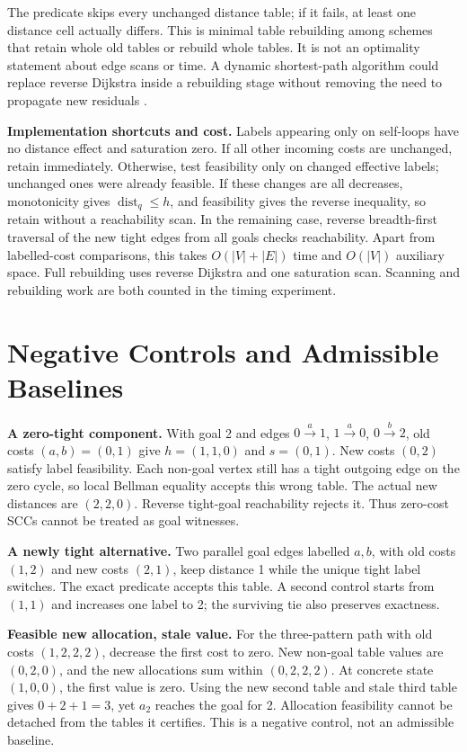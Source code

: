 The predicate skips every unchanged distance table; if it fails, at least one distance cell actually differs. This is minimal table rebuilding among schemes that retain whole old tables or rebuild whole tables. It is not an optimality statement about edge scans or time. A dynamic shortest-path algorithm could replace reverse Dijkstra inside a rebuilding stage without removing the need to propagate new residuals \citep{incremental2020}.

\textbf{Implementation shortcuts and cost.} Labels appearing only on self-loops have no distance effect and saturation zero. If all other incoming costs are unchanged, retain immediately. Otherwise, test feasibility only on changed effective labels; unchanged ones were already feasible. If these changes are all decreases, monotonicity gives $\operatorname{dist}_q\leq h$, and feasibility gives the reverse inequality, so retain without a reachability scan. In the remaining case, reverse breadth-first traversal of the new tight edges from all goals checks reachability. Apart from labelled-cost comparisons, this takes $O(|V|+|E|)$ time and $O(|V|)$ auxiliary space. Full rebuilding uses reverse Dijkstra and one saturation scan. Scanning and rebuilding work are both counted in the timing experiment.

\section{Negative Controls and Admissible Baselines}
\textbf{A zero-tight component.} With goal 2 and edges $0\xrightarrow{a}1$, $1\xrightarrow{a}0$, $0\xrightarrow{b}2$, old costs $(a,b)=(0,1)$ give $h=(1,1,0)$ and $s=(0,1)$. New costs $(0,2)$ satisfy label feasibility. Each non-goal vertex still has a tight outgoing edge on the zero cycle, so local Bellman equality accepts this wrong table. The actual new distances are $(2,2,0)$. Reverse tight-goal reachability rejects it. Thus zero-cost SCCs cannot be treated as goal witnesses.

\textbf{A newly tight alternative.} Two parallel goal edges labelled $a,b$, with old costs $(1,2)$ and new costs $(2,1)$, keep distance 1 while the unique tight label switches. The exact predicate accepts this table. A second control starts from $(1,1)$ and increases one label to 2; the surviving tie also preserves exactness.

\textbf{Feasible new allocation, stale value.} For the three-pattern path with old costs $(1,2,2,2)$, decrease the first cost to zero. New non-goal table values are $(0,2,0)$, and the new allocations sum within $(0,2,2,2)$. At concrete state $(1,0,0)$, the first value is zero. Using the new second table and stale third table gives $0+2+1=3$, yet $a_2$ reaches the goal for 2. Allocation feasibility cannot be detached from the tables it certifies. This is a negative control, not an admissible baseline.

